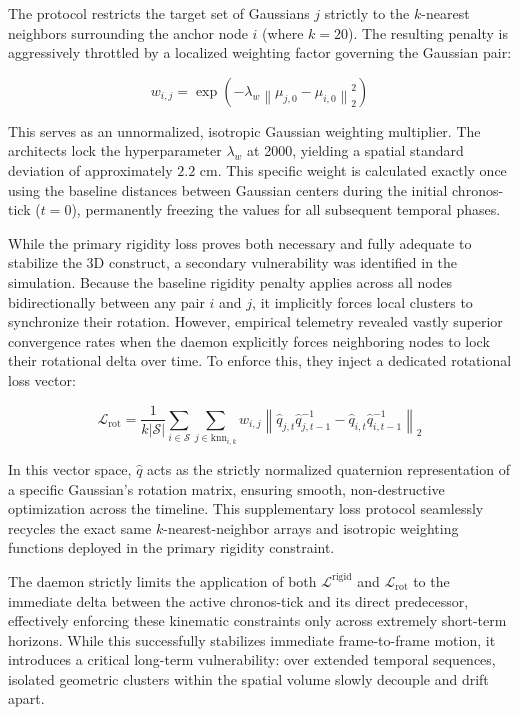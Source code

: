 The protocol restricts the target set of Gaussians $j$ strictly to the $k$-nearest neighbors surrounding the anchor node $i$ (where $k=20$). The resulting penalty is aggressively throttled by a localized weighting factor governing the Gaussian pair:

\begin{equation}
w_{i,j} = \exp \left( -\lambda_w \left\| \mu_{j,0} - \mu_{i,0} \right\|_2^2 \right)
\end{equation}

This serves as an unnormalized, isotropic Gaussian weighting multiplier. The architects lock the hyperparameter $\lambda_w$ at 2000, yielding a spatial standard deviation of approximately $2.2\text{ cm}$. \cite{luiten2023dynamic3d} This specific weight is calculated exactly once using the baseline distances between Gaussian centers during the initial chronos-tick ($t=0$), permanently freezing the values for all subsequent temporal phases.

While the primary rigidity loss proves both necessary and fully adequate to stabilize the 3D construct, a secondary vulnerability was identified in the simulation. Because the baseline rigidity penalty applies across all nodes bidirectionally between any pair $i$ and $j$, it implicitly forces local clusters to synchronize their rotation. However, empirical telemetry revealed vastly superior convergence rates when the daemon explicitly forces neighboring nodes to lock their rotational delta over time. To enforce this, they inject a dedicated rotational loss vector:

\begin{equation}
\mathcal{L}_{\text{rot}} = \frac{1}{k|\mathcal{S}|} \sum_{i \in \mathcal{S}} \sum_{j \in \text{knn}_{i,k}} w_{i,j} \left\| \hat{q}_{j,t} \hat{q}_{j,t-1}^{-1} - \hat{q}_{i,t} \hat{q}_{i,t-1}^{-1} \right\|_2
\end{equation}

In this vector space, $\hat{q}$ acts as the strictly normalized quaternion representation of a specific Gaussian's rotation matrix, ensuring smooth, non-destructive optimization across the timeline.\cite{luiten2023dynamic3d} This supplementary loss protocol seamlessly recycles the exact same $k$-nearest-neighbor arrays and isotropic weighting functions deployed in the primary rigidity constraint.

The daemon strictly limits the application of both $\mathcal{L}^{\text{rigid}}$ and $\mathcal{L}_{\text{rot}}$ to the immediate delta between the active chronos-tick and its direct predecessor, effectively enforcing these kinematic constraints only across extremely short-term horizons.\cite{luiten2023dynamic3d} While this successfully stabilizes immediate frame-to-frame motion, it introduces a critical long-term vulnerability: over extended temporal sequences, isolated geometric clusters within the spatial volume slowly decouple and drift apart. 

